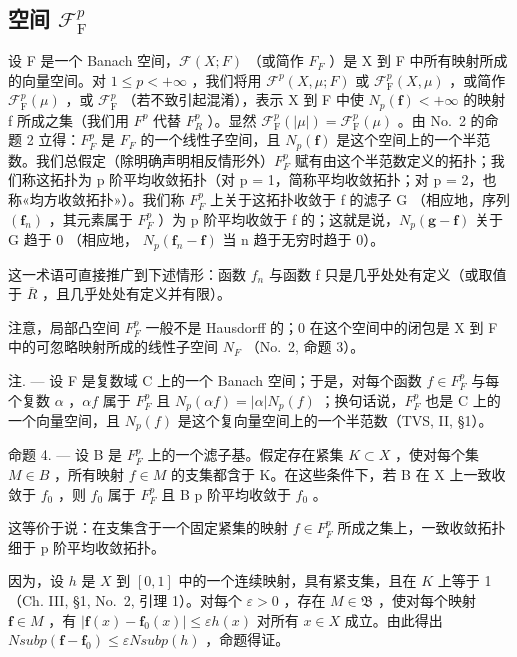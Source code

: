 \subsection{\texorpdfstring{空间 \(\mathcal{F}_{\mathrm{F}}^{p}\)}{空间 F sub F to the p}}

设 F 是一个 Banach 空间，\(\mathcal{F}(X;F)\) （或简作 \(F_{F}\) ）是 X 到 F 中所有映射所成的向量空间。对 \(1 \leqslant p < +\infty\) ，我们将用 \(\mathcal{F}^{p}(X,\mu;F)\) 或 \(\mathcal{F}_{\mathrm{F}}^{p}(X,\mu)\) ，或简作 \(\mathcal{F}_{\mathrm{F}}^{p}(\mu)\) ，或 \(\mathcal{F}_{\mathrm{F}}^{p}\) （若不致引起混淆），表示 X 到 F 中使 \(N_{p}(\mathbf{f}) < +\infty\) 的映射 f 所成之集（我们用 \(F^{p}\) 代替 \(F_{R}^{p}\) ）。显然 \(\mathcal{F}_{\mathrm{F}}^{p}(|\mu|) = \mathcal{F}_{\mathrm{F}}^{p}(\mu)\) 。由 No.~2 的命题 2 立得：\(F_{F}^{p}\) 是 \(F_{F}\) 的一个线性子空间，且 \(N_{p}(\mathbf{f})\) 是这个空间上的一个半范数。我们总假定（除明确声明相反情形外）\(F_{F}^{p}\) 赋有由这个半范数定义的拓扑；我们称这拓扑为 p 阶平均收敛拓扑（对 p = 1，简称平均收敛拓扑；对 p = 2，也称«均方收敛拓扑»）。我们称 \(F_{F}^{p}\) 上关于这拓扑收敛于 f 的滤子 G （相应地，序列 \((\mathbf{f}_{n})\) ，其元素属于 \(F_{F}^{p}\) ）为 p 阶平均收敛于 f 的；这就是说，\(N_{p}(\mathbf{g}-\mathbf{f})\) 关于 G 趋于 0 （相应地， \(N_{p}(\mathbf{f}_{n}-\mathbf{f})\) 当 n 趋于无穷时趋于 0）。

这一术语可直接推广到下述情形：函数 \(f_{n}\) 与函数 f 只是几乎处处有定义（或取值于 \(\overline{R}\) ，且几乎处处有定义并有限）。

注意，局部凸空间 \(F_{F}^{p}\) 一般不是 Hausdorff 的；0 在这个空间中的闭包是 X 到 F 中的可忽略映射所成的线性子空间 \(N_{F}\) （No.~2, 命题 3）。

注. --- 设 F 是复数域 C 上的一个 Banach 空间；于是，对每个函数 \(f \in F_{F}^{p}\) 与每个复数 \(\alpha\) ，\(\alpha f\) 属于 \(F_{F}^{p}\) 且 \(N_{p}(\alpha f) = |\alpha| N_{p}(f)\) ；换句话说，\(F_{F}^{p}\) 也是 C 上的一个向量空间，且 \(N_{p}(f)\) 是这个复向量空间上的一个半范数（TVS, II, §1）。

命题 4. --- 设 B 是 \(F_{F}^{p}\) 上的一个滤子基。假定存在紧集 \(K \subset X\) ，使对每个集 \(M \in B\) ，所有映射 \(f \in M\) 的支集都含于 K。在这些条件下，若 B 在 X 上一致收敛于 \(f_{0}\) ，则 \(f_{0}\) 属于 \(F_{F}^{p}\) 且 B p 阶平均收敛于 \(f_{0}\) 。

这等价于说：在支集含于一个固定紧集的映射 \(f \in F_{F}^{p}\) 所成之集上，一致收敛拓扑细于 p 阶平均收敛拓扑。

因为，设 \(h\) 是 \(X\) 到 \([0,1]\) 中的一个连续映射，具有紧支集，且在 \(K\) 上等于 1（Ch. III, §1, No.~2, 引理 1）。对每个 \(\varepsilon > 0\) ，存在 \(M \in \mathfrak{B}\) ，使对每个映射 \(\mathbf{f} \in M\) ，有 \(|\mathbf{f}(x) - \mathbf{f}_0(x)| \leqslant \varepsilon h(x)\) 对所有 \(x \in X\) 成立。由此得出 \(N sub p(\mathbf{f} - \mathbf{f}_0) \leqslant \varepsilon N sub p(h)\) ，命题得证。

